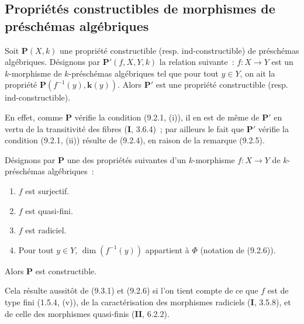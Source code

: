 \subsection{Propriétés constructibles de morphismes de préschémas algébriques}

\begin{proposition}[9.3.1]
\label{IV.9.3.1-fr}
Soit $\boldsymbol{P}(X,k)$ une propriété constructible \textup{(resp.} ind-constructible\textup{)}
de préschémas algébriques. Désignons par $\boldsymbol{P}'(f,X,Y,k)$ la relation
suivante~: $f:X\to Y$ est un $k$-morphisme de $k$-préschémas algébriques tel
que pour tout $y\in Y$, on ait la propriété
$\boldsymbol{P}(f^{-1}(y),\boldsymbol{k}(y))$. Alors $\boldsymbol{P}'$ est une propriété
constructible \textup{(resp.} ind-constructible\textup{)}.
\end{proposition}

En effet, comme $\boldsymbol{P}$ vérifie la condition (9.2.1, (i)), il en est de
même de $\boldsymbol{P}'$ en vertu de la transitivité des fibres (\textbf{I}, 3.6.4)~; par
ailleurs le fait que $\boldsymbol{P}'$ vérifie la condition (9.2.1, (ii)) résulte
de (9.2.4), en raison de la remarque (9.2.5).

\begin{proposition}[9.3.2]
\label{IV.9.3.2-fr}
Désignons par $\boldsymbol{P}$ une des propriétés suivantes d'un $k$-morphisme
$f:X\to Y$ de $k$-préschémas algébriques~:
\begin{enumerate}[label=\textup{(\roman*)}]
  \item $f$ est surjectif.
  \item $f$ est quasi-fini.
  \item $f$ est radiciel.
  \item Pour tout $y\in Y$, $\dim(f^{-1}(y))$ appartient à $\Phi$ (notation
  de \textup{(9.2.6)}).
\end{enumerate}
Alors $\boldsymbol{P}$ est constructible.
\end{proposition}

Cela résulte aussitôt de (9.3.1) et (9.2.6) si l'on tient compte de ce que $f$
est de type fini (1.5.4, (v)), de la caractérisation des morphismes radiciels
(\textbf{I}, 3.5.8), et de celle des morphismes quasi-finis (\textbf{II}, 6.2.2).

